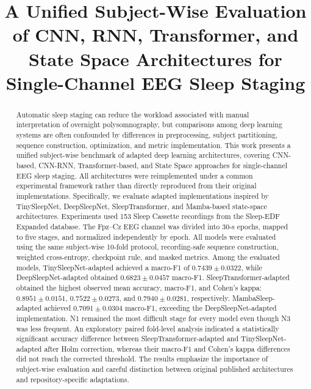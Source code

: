 \documentclass[conference]{IEEEtran}
\begin{document}
\title{A Unified Subject-Wise Evaluation of CNN, RNN, Transformer, and State Space Architectures for Single-Channel EEG Sleep Staging}

\author{
}

\maketitle

\begin{abstract}
Automatic sleep staging can reduce the workload associated with manual interpretation of overnight polysomnography, but comparisons among deep learning systems are often confounded by differences in preprocessing, subject partitioning, sequence construction, optimization, and metric implementation. This work presents a unified subject-wise benchmark of adapted deep learning architectures, covering CNN-based, CNN-RNN, Transformer-based, and State Space approaches for single-channel EEG sleep staging. All architectures were reimplemented under a common experimental framework rather than directly reproduced from their original implementations. Specifically, we evaluate adapted implementations inspired by TinySleepNet, DeepSleepNet, SleepTransformer, and Mamba-based state-space architectures. Experiments used 153 Sleep Cassette recordings from the Sleep-EDF Expanded database. The Fpz--Cz EEG channel was divided into 30-s epochs, mapped to five stages, and normalized independently by epoch. All models were evaluated using the same subject-wise 10-fold protocol, recording-safe sequence construction, weighted cross-entropy, checkpoint rule, and masked metrics. Among the evaluated models, TinySleepNet-adapted achieved a macro-F1 of $0.7439\pm0.0322$, while DeepSleepNet-adapted obtained $0.6823\pm0.0457$ macro-F1. SleepTransformer-adapted obtained the highest observed mean accuracy, macro-F1, and Cohen's kappa: $0.8951\pm0.0151$, $0.7522\pm0.0273$, and $0.7940\pm0.0281$, respectively. MambaSleep-adapted achieved $0.7091\pm0.0304$ macro-F1, exceeding the DeepSleepNet-adapted implementation. N1 remained the most difficult stage for every model even though N3 was less frequent. An exploratory paired fold-level analysis indicated a statistically significant accuracy difference between SleepTransformer-adapted and TinySleepNet-adapted after Holm correction, whereas their macro-F1 and Cohen's kappa differences did not reach the corrected threshold. The results emphasize the importance of subject-wise evaluation and careful distinction between original published architectures and repository-specific adaptations.
\end{abstract}
\end{document}
